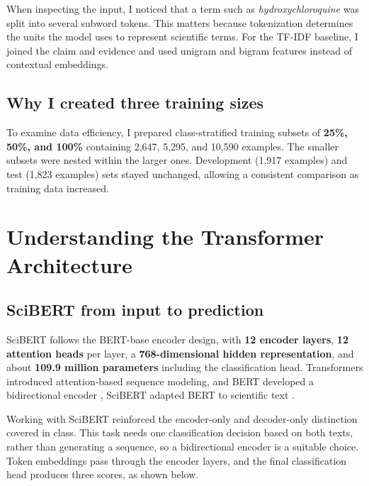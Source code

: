 \documentclass[11pt,letterpaper]{article}
\begin{document}
When inspecting the input, I noticed that a term such as \emph{hydroxychloroquine} was split into several subword tokens. This matters because tokenization determines the units the model uses to represent scientific terms. For the TF-IDF baseline, I joined the claim and evidence and used unigram and bigram features instead of contextual embeddings.

\subsection{Why I created three training sizes}
To examine data efficiency, I prepared class-stratified training subsets of \textbf{25\%, 50\%, and 100\%} containing 2,647, 5,295, and 10,590 examples. The smaller subsets were nested within the larger ones. Development (1,917 examples) and test (1,823 examples) sets stayed unchanged, allowing a consistent comparison as training data increased.

\section{Understanding the Transformer Architecture}
\subsection{SciBERT from input to prediction}
SciBERT follows the BERT-base encoder design, with \textbf{12 encoder layers}, \textbf{12 attention heads} per layer, a \textbf{768-dimensional hidden representation}, and about \textbf{109.9 million parameters} including the classification head. Transformers introduced attention-based sequence modeling, and BERT developed a bidirectional encoder \cite{vaswani,devlin}, SciBERT adapted BERT to scientific text \cite{beltagy}.

Working with SciBERT reinforced the encoder-only and decoder-only distinction covered in class. This task needs one classification decision based on both texts, rather than generating a sequence, so a bidirectional encoder is a suitable choice. Token embeddings pass through the encoder layers, and the final classification head produces three scores, as shown below.
\end{document}
